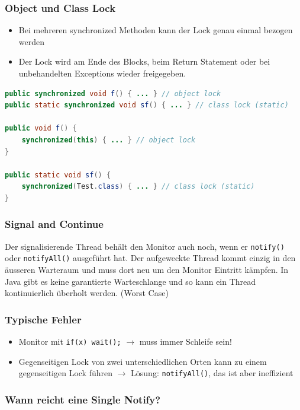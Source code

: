 \subsubsection{Object und Class Lock}

\begin{itemize}
	\item Bei mehreren synchronized Methoden kann der Lock genau einmal bezogen werden
	\item Der Lock wird am Ende des Blocks, beim Return Statement oder bei unbehandelten Exceptions wieder freigegeben.
\end{itemize}


\begin{lstlisting}[language=java]
public synchronized void f() { ... } // object lock
public static synchronized void sf() { ... } // class lock (static)

public void f() {
	synchronized(this) { ... } // object lock
}

public static void sf() {
	synchronized(Test.class) { ... } // class lock (static)
}
\end{lstlisting}

\subsubsection{Signal and Continue}
Der signalisierende Thread behält den Monitor auch noch, wenn er \lstinline|notify()| oder \lstinline|notifyAll()| ausgeführt hat. Der aufgeweckte Thread kommt einzig in den äusseren Warteraum und muss dort neu um den Monitor Eintritt kämpfen. In Java gibt es keine garantierte Warteschlange und so kann ein Thread kontinuierlich überholt werden. (Worst Case)



\subsubsection{Typische Fehler}

\begin{itemize}
	\item Monitor mit \lstinline|if(x) wait();| $\rightarrow$ muss immer Schleife sein!
	\item Gegenseitigen Lock von zwei unterschiedlichen Orten kann zu einem gegenseitigen Lock führen $\rightarrow$ Lösung: \lstinline|notifyAll()|, das ist aber ineffizient
\end{itemize}

\subsubsection{Wann reicht eine Single Notify?}

